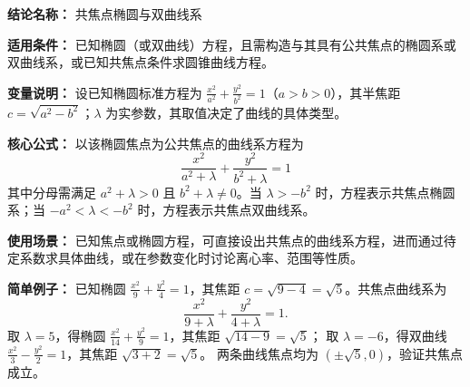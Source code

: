 \textbf{结论名称：} 共焦点椭圆与双曲线系

\textbf{适用条件：} 已知椭圆（或双曲线）方程，且需构造与其具有公共焦点的椭圆系或双曲线系，或已知共焦点条件求圆锥曲线方程。

\textbf{变量说明：} 设已知椭圆标准方程为 \(\frac{x^2}{a^2}+\frac{y^2}{b^2}=1\)（\(a>b>0\)），其半焦距 \(c=\sqrt{a^2-b^2}\)；\(\lambda\) 为实参数，其取值决定了曲线的具体类型。

\textbf{核心公式：} 以该椭圆焦点为公共焦点的曲线系方程为
\[
\boxed{\frac{x^2}{a^2+\lambda}+\frac{y^2}{b^2+\lambda}=1}
\]
其中分母需满足 \(a^2+\lambda>0\) 且 \(b^2+\lambda\neq0\)。当 \(\lambda>-b^2\) 时，方程表示共焦点椭圆系；当 \(-a^2<\lambda<-b^2\) 时，方程表示共焦点双曲线系。

\textbf{使用场景：} 已知焦点或椭圆方程，可直接设出共焦点的曲线系方程，进而通过待定系数求具体曲线，或在参数变化时讨论离心率、范围等性质。

\textbf{简单例子：} 已知椭圆 \(\frac{x^2}{9}+\frac{y^2}{4}=1\)，其焦距 \(c=\sqrt{9-4}=\sqrt5\)。共焦点曲线系为
\[
\frac{x^2}{9+\lambda}+\frac{y^2}{4+\lambda}=1.
\]
取 \(\lambda=5\)，得椭圆 \(\frac{x^2}{14}+\frac{y^2}{9}=1\)，其焦距 \(\sqrt{14-9}=\sqrt5\)；
取 \(\lambda=-6\)，得双曲线 \(\frac{x^2}{3}-\frac{y^2}{2}=1\)，其焦距 \(\sqrt{3+2}=\sqrt5\)。
两条曲线焦点均为 \((\pm\sqrt5,0)\)，验证共焦点成立。